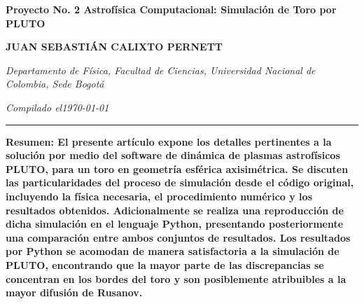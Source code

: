\documentclass[11pt, letterpaper]{article}
\begin{document}

\begin{center}
    {\raggedright\sffamily\bfseries \fontsize{21}{23}\selectfont Proyecto No. 2 Astrofísica Computacional: Simulación de Toro por PLUTO\par}
    \vspace{1em}
    {\raggedright\sffamily\bfseries \fontsize{11}{13}\selectfont JUAN SEBASTIÁN CALIXTO PERNETT\par}
    \vspace{0.5em}
    {\raggedright\sffamily\itshape \fontsize{8}{10}\selectfont Departamento de Física, Facultad de Ciencias, Universidad Nacional de Colombia, Sede Bogotá\/\par}
    {\raggedright\sffamily \fontsize{8}{10}\selectfont {jcalixtop@unal.edu.co}\par}
    \vspace{0.5em}
    {\raggedright\sffamily\itshape \fontsize{8}{10}\selectfont Compilado el\/\today\par}
    \vspace{0.6em}
    \hrule
    \vspace{0.3em}
\end{center}


\noindent
{\small\bfseries \textbf{Resumen}: El presente artículo expone los detalles pertinentes a la solución por medio del software de dinámica de plasmas astrofísicos PLUTO, para un toro en geometría esférica axisimétrica. Se discuten las particularidades del proceso de simulación desde el código original, incluyendo la física necesaria, el procedimiento numérico y los resultados obtenidos. Adicionalmente se realiza una reproducción de dicha simulación en el lenguaje Python, presentando posteriormente una comparación entre ambos conjuntos de resultados. Los resultados por Python se acomodan de manera satisfactoria a la simulación de PLUTO, encontrando que la mayor parte de las discrepancias se concentran en los bordes del toro y son posiblemente atribuibles a la mayor difusión de Rusanov. \par}
\end{document}

